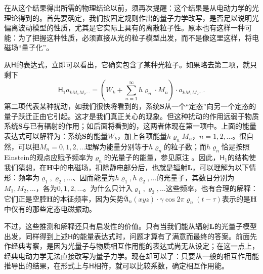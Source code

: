 \documentclass[fontsize=13pt,twoside,openany,headings=normal,parskip=false,bookmarkpackage=false,DIV=calc]{scrbook}
\begin{document}
在从这个结果得出所需的物理结论以前，须再次提醒：这个结果是从电动力学的光理论得到的。首先要确定，我们按固定规则作出的量子力学改写，是否足以说明光偏离波动模型的性质，尤其是它实际上具有的离散粒子性。原本也有这样一种可能：为了把握这种性质，必须直接从光的粒子模型出发，而不是像这里这样，将电磁场“量子化”。

从$\mathsf{H}$的表达式，立即可以看出，它确实包含了某种光粒子。如果略去第二项，就只剩下
\[
 \mathsf{H}_1a_{kM_1M_2\cdots}=\left(W_k+\sum_{n=1}^{\infty}h\varrho_n\cdot M_n\right)\cdot a_{kM_1M_2\cdots}.
\]
第二项代表某种扰动，如我们很快将看到的，系统$\boldsymbol{S}$从一个“定态”向另一个定态的量子跃迁正由它引起。这才是我们真正关心的现象。但这种扰动的作用远弱于物质系统$\boldsymbol{S}$与已有辐射的作用；如后面将看到的，这两者体现在第一项中。上面的能量表达式可以解释为：系统$\boldsymbol{S}$的能量$W_k$，加上各项能量$h\varrho_n M_n$，$n=1,\allowbreak 2,\allowbreak \ldots$。很自然，可以把$M_n=0,\allowbreak 1,\allowbreak 2,\allowbreak \ldots$理解为能量分别等于$h\varrho_n$的粒子数；而$h\varrho_n$恰是按照Einstein的观点应赋予频率为$\varrho_n$的光量子的能量，参见原注 \hyperlink{note-134}{}。因此，$\mathsf{H}_1$的结构使我们猜想，\hypertarget{origpage-145}{}\label{origpage-145}在$\boldsymbol H$中的电磁场，扣除静电部分后，也就是辐射$\boldsymbol{L}$，可以理解为以下情形：频率为$\varrho_1,\allowbreak \varrho_2,\allowbreak \ldots$、因而能量为$h\varrho_1,\allowbreak h\varrho_2,\allowbreak \ldots$的光量子，其数目分别为$M_1,\allowbreak M_2,\allowbreak \ldots$，各为$0,\allowbreak 1,\allowbreak 2,\allowbreak \ldots$。为什么只计入$\varrho_1,\allowbreak \varrho_2,\allowbreak \ldots$这些频率，也有合理的解释：它们正是空腔$\boldsymbol H$的本征频率，因为矢势$\overline{\mathfrak A}_n(xyz)\cdot\gamma\cos2\pi\varrho_n(t-\tau)$表示的是$\boldsymbol H$中仅有的那些定态电磁振动。

不过，这些推测和解释还只有启发性的价值。只有当我们能从辐射$\boldsymbol{L}$的光量子模型出发，同样得到上述$\mathsf{H}$的能量表达式时，问题才算有了满意而最终的答案。前面先作经典考察，是因为光量子与物质相互作用能的表达式尚无从设定；在这一点上，经典电动力学无法直接改写为量子力学。现在却可以了：只要从一般的相互作用能推导出的结果，在形式上与$\mathsf{H}$相符，就可以比较系数，确定相互作用能。
\end{document}

